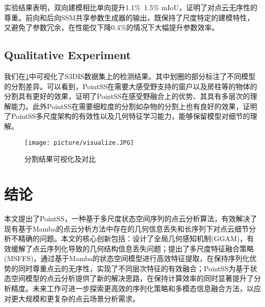 \documentclass[preprint,12pt]{elsarticle}
\begin{document}
实验结果表明，双向建模相比单向提升1.1\%~1.5\% mIoU，证明了对点云无序性的尊重。前向和后向SSM共享参数生成器的输出，既保持了尺度特定的建模特性，又避免了参数冗余，在性能仅下降0.4\%的情况下大幅提升参数效率。



\subsection{Qualitative Experiment}
我们在\cref{fig:vis}中可视化了S3DIS数据集上的检测结果。其中划圈的部分标注了不同模型的分割差异。可以看到，PointSS在需要大感受野支持的窗户以及房柱等的物体的分割具有更好的效果，证明了PointSS在感受野融合上的优势、其具有多层次的理解能力。此外PointSS在需要细粒度的分割如杂物的分割上也有良好的效果，证明了PointSS多尺度架构的有效性以及几何特征学习能力，能够保留模型对细节的理解。
\begin{figure}[htbp]
	\centering
	\texttt{[image: picture/visualize.JPG]}
	\caption{分割结果可视化及对比}
	\label{fig:vis}
\end{figure}



\section{结论}
本文提出了PointSS，一种基于多尺度状态空间序列的点云分析算法，有效解决了现有基于Mamba的点云分析方法中存在的几何信息丢失和长序列下对点云细节分析不精确的问题。本文的核心创新包括：设计了全局几何感知机制(GGAM)，有效缓解了点云序列化导致的几何结构信息丢失问题；提出了多尺度特征融合策略(MSFFS)，通过基于Mamba的状态空间模型进行高效特征提取，在保持序列化优势的同时尊重点云的无序性，实现了不同层次特征的有效融合；PointSS为基于状态空间模型的点云分析提供了新的解决思路，在保持计算效率的同时显著提升了分析精度。未来工作可进一步探索更高效的序列化策略和多模态信息融合方法，以应对更大规模和更复杂的点云场景分析需求。









\end{document}
